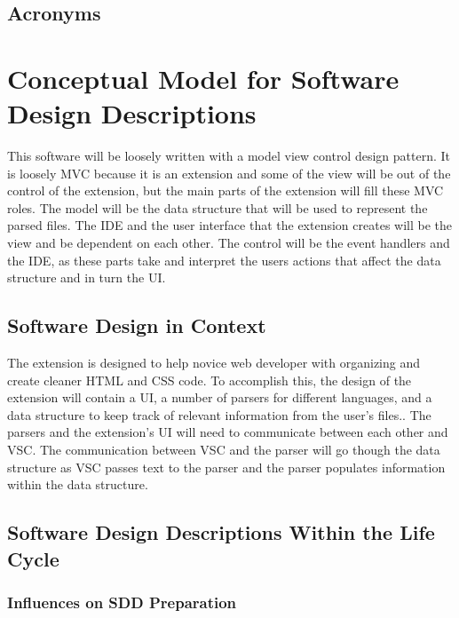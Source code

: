 \documentclass[letterpaper,10pt,titlepage,draftclsnofoot,onecolumn,onesided] {IEEEtran}
\begin{document}
\subsection{Acronyms}
\newtheorem{VSC}{An acronym of Visual Studio Code. Visual Studio Code is the IDE for which the postal extension is being built.}
\newtheorem{IDE}{An acronym of Integrated Development Environment.}
\newtheorem{UI}{An acronym of User Interface}
\newtheorem{MVC}{Model-View-Controller}


\section{Conceptual Model for Software Design Descriptions}
This software will be loosely written with a model view control design pattern.
It is loosely MVC because it is an extension and some of the view will be out of the control of the extension, but the main parts of the extension will fill these MVC roles.
The model will be the data structure that will be used to represent the parsed files. 
The IDE and the user interface that the extension creates will be the view and be dependent on each other.
The control will be the event handlers and the IDE, as these parts take and interpret the users actions that affect the data structure and in turn the UI.

\subsection{Software Design in Context}
The extension is designed to help novice web developer with organizing and create cleaner HTML and CSS code. 
To accomplish this, the design of the extension will contain a UI, a number of parsers for different languages, and a data structure to keep track of relevant information from the user's files..
The parsers and the extension's UI will need to communicate between each other and VSC.
The communication between VSC and the parser will go though the data structure as VSC passes text to the parser and the parser populates information within the data structure.

\subsection{Software Design Descriptions Within the Life Cycle}
\subsubsection{Influences on SDD Preparation}
\end{document}
